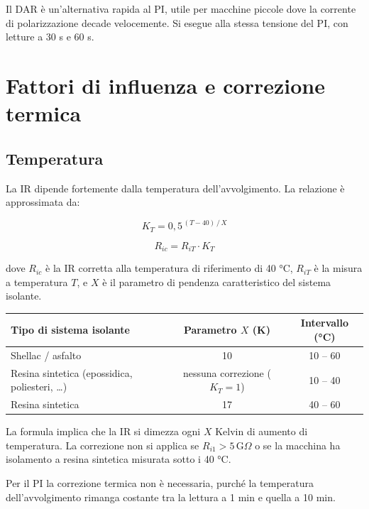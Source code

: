 \documentclass[a4paper,11pt]{article}
\begin{document}
Il DAR è un'alternativa rapida al PI, utile per macchine piccole dove la corrente di polarizzazione decade velocemente. Si esegue alla stessa tensione del PI, con letture a 30 s e 60 s.

\section{Fattori di influenza e correzione termica}

\subsection{Temperatura}

La IR dipende fortemente dalla temperatura dell'avvolgimento. La relazione è approssimata da:

\begin{equation}
  K_T = 0{,}5^{\,(T - 40)\,/\,X}
\end{equation}

\begin{equation}
  R_{ic} = R_{iT} \cdot K_T
\end{equation}

dove $R_{ic}$ è la IR corretta alla temperatura di riferimento di 40 °C, $R_{iT}$ è la misura a temperatura $T$, e $X$ è il parametro di pendenza caratteristico del sistema isolante.

\begin{center}
\begin{tabular}{lcc}
\toprule
\textbf{Tipo di sistema isolante} & \textbf{Parametro $X$ (K)} & \textbf{Intervallo (°C)} \\
\midrule
Shellac / asfalto          & 10 & 10 – 60 \\
Resina sintetica (epossidica, poliesteri, \ldots) & nessuna correzione ($K_T = 1$) & 10 – 40 \\
Resina sintetica           & 17 & 40 – 60 \\
\bottomrule
\end{tabular}
\end{center}

La formula implica che la IR si dimezza ogni $X$ Kelvin di aumento di temperatura. La correzione non si applica se $R_{i1} > 5\,\text{G}\Omega$ o se la macchina ha isolamento a resina sintetica misurata sotto i 40 °C.

Per il PI la correzione termica non è necessaria, purché la temperatura dell'avvolgimento rimanga costante tra la lettura a 1 min e quella a 10 min.
\end{document}
